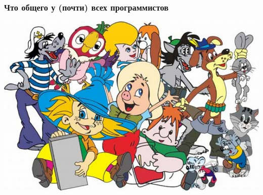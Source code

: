 \documentclass[10pt,pdf,hyperref={unicode}]{beamer}
\begin{document}
\begin{frame}
\frametitle{Что общего у (почти) всех программистов} 

\center
\includegraphics[height=0.6\textheight]{./multi_fun.png}

\end{frame}
\end{document}
